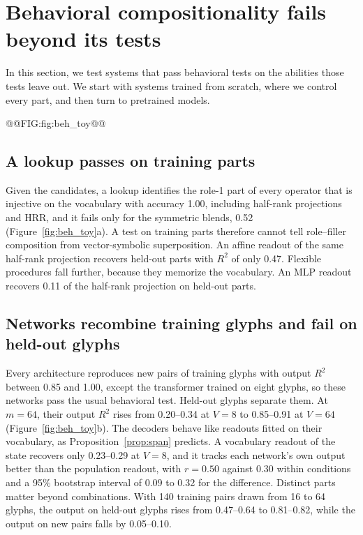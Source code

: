 \section{Behavioral compositionality fails beyond its tests}
\label{sec:results}

In this section, we test systems that pass behavioral tests on the abilities those tests leave out. We start with systems trained from scratch, where we control every part, and then turn to pretrained models.

@@FIG:fig:beh_toy@@

\subsection{A lookup passes on training parts}
\label{sec:lookup}

Given the candidates, a lookup identifies the role-1 part of every operator that is injective on the vocabulary with accuracy 1.00, including half-rank projections and HRR, and it fails only for the symmetric blends, 0.52 (Figure~\ref{fig:beh_toy}a). A test on training parts therefore cannot tell role--filler composition from vector-symbolic superposition. An affine readout of the same half-rank projection recovers held-out parts with $R^2$ of only 0.47. Flexible procedures fall further, because they memorize the vocabulary. An MLP readout recovers 0.11 of the half-rank projection on held-out parts.

\subsection{Networks recombine training glyphs and fail on held-out glyphs}
\label{sec:networks}

Every architecture reproduces new pairs of training glyphs with output $R^2$ between 0.85 and 1.00, except the transformer trained on eight glyphs, so these networks pass the usual behavioral test. Held-out glyphs separate them. At $m = 64$, their output $R^2$ rises from 0.20--0.34 at $V = 8$ to 0.85--0.91 at $V = 64$ (Figure~\ref{fig:beh_toy}b). The decoders behave like readouts fitted on their vocabulary, as Proposition~\ref{prop:span} predicts. A vocabulary readout of the state recovers only 0.23--0.29 at $V = 8$, and it tracks each network's own output better than the population readout, with $r = 0.50$ against $0.30$ within conditions and a 95\% bootstrap interval of 0.09 to 0.32 for the difference. Distinct parts matter beyond combinations. With 140 training pairs drawn from 16 to 64 glyphs, the output on held-out glyphs rises from 0.47--0.64 to 0.81--0.82, while the output on new pairs falls by 0.05--0.10.

